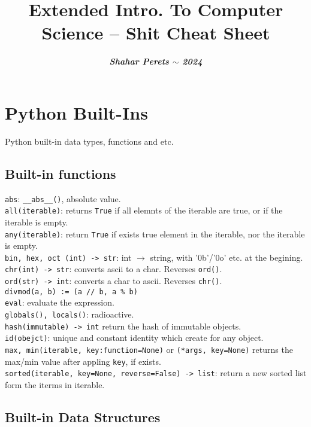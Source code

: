 \documentclass[]{article}
\title{\vspace{-0.8cm}Extended Intro. To Computer Science -- Shit Cheat Sheet}
\author{\textbf{\textit{Shahar Perets $\sim$ 2024}}}
\date{}
\newcommand\fortitle[1] {\Large #1 \normalsize}
\begin{document}
	\setlength{\abovedisplayskip}{0pt}
	\setlength{\belowdisplayskip}{2pt}
	\setlength{\abovedisplayshortskip}{0pt}
	\setlength{\belowdisplayshortskip}{0pt}
	
	\setlength{\columnseprule}{0.2pt}
	
	\section{\fortitle{Python Built-Ins}}Python built-in data types, functions and etc. 
	\begin{multicols}{2}
		
		\subsection{Built-in functions}
		
		\texttt{abs}: \texttt{\_\_abs\_\_()}, absolute value. \\
		\texttt{all(iterable)}: returns \texttt{True} if all elemnts of the iterable are true, or if the iterable is empty. \\
		\texttt{any(iterable)}: return \texttt{True} if exists true element in the iterable, nor the iterable is empty. \\
		\texttt{bin, hex, oct (int) -> str}: int $ \rightarrow $ string, with '0b'/'0o' etc. at the begining. \\
		\texttt{chr(int) -> str}: converts ascii to a char. Reverses \texttt{ord()}. \\
		\texttt{ord(str) -> int}: converts a char to ascii. Reverses \texttt{chr()}. \\
		\texttt{divmod(a, b) := (a // b, a \% b)} \\
		\texttt{eval}: evaluate the expression. \\
		\texttt{globals(), locals()}: radioactive. \\
		\texttt{hash(immutable) -> int} return the hash of immutable objects. \\
		\texttt{id(obejct)}: unique and constant identity which create for any object. \\
		\texttt{max, min(iterable, key:function=None)} or \texttt{(*args, key=None)} returns the max/min value after appling \texttt{key}, if exists. \\
		\texttt{sorted(iterable, key=None, reverse=False) -> list}: return a new sorted list form the iterms in iterable. 
		
		\subsection{Built-in Data Structures}

\end{multicols}
\end{document}
